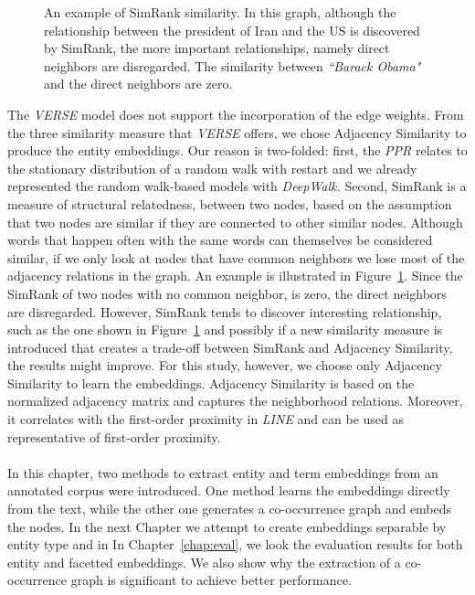 \begin{figure}
\centering 
\resizebox{0.50\textwidth}{0.35\textwidth}{      

}
\caption{An example of SimRank similarity. In this graph, although the relationship between the president of Iran and the US is discovered by SimRank, the more important relationships, namely direct neighbors are disregarded. The similarity between \emph{``Barack Obama"} and the direct neighbors are zero.  }
\label{fig:simrank}
\end{figure}
The \emph{VERSE} model does not support the incorporation of the edge weights. From the three similarity measure that \emph{VERSE} offers, we chose Adjacency Similarity to produce the entity embeddings. Our reason is two-folded: first, the \emph{PPR} relates to the stationary distribution of a random walk with restart and we already represented the random walk-based models with \emph{DeepWalk.} Second, SimRank is a measure of structural relatedness, between two nodes, based on the assumption that two nodes are
similar if they are connected to other similar nodes. Although words that happen often with the same words can themselves be considered similar, if we only look at nodes that have common neighbors we lose most of the adjacency relations in the graph. An example is illustrated in Figure~\ref{fig:simrank}. Since the SimRank of two nodes with no common neighbor, is zero, the direct neighbors are disregarded. However, SimRank tends to discover interesting relationship, such as the one shown in Figure~\ref{fig:simrank} and possibly if a new similarity measure is introduced that creates a trade-off between SimRank and Adjacency Similarity, the results might improve. For this study, however, we choose only Adjacency Similarity to learn the embeddings. Adjacency Similarity is based on the normalized adjacency matrix and captures the neighborhood relations. Moreover, it correlates with the first-order proximity in \emph{LINE} and can be used as representative of first-order proximity. \\
\\
In this chapter,  two methods to extract entity and term embeddings from an annotated corpus were introduced. One method learns the embeddings directly from the text, while the other one generates a co-occurrence graph and embeds the nodes. In the next Chapter we attempt to create embeddings separable by entity type and in In Chapter~\ref{chap:eval}, we look the evaluation results for both entity and facetted embeddings. We also show why the extraction of a co-occurrence graph is significant to achieve better performance. 